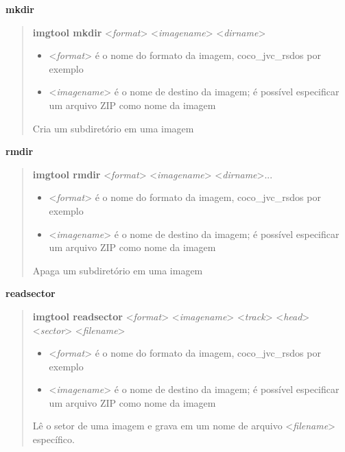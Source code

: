 \documentclass[letterpaper,10pt,brazil]{sphinxmanual}
\begin{document}
\textbf{mkdir}
\begin{quote}

\textbf{imgtool mkdir} \textless{}\emph{format}\textgreater{} \textless{}\emph{imagename}\textgreater{} \textless{}\emph{dirname}\textgreater{}
\begin{itemize}
\item {} 
\textless{}\emph{format}\textgreater{} é o nome do formato da imagem, coco\_jvc\_rsdos por exemplo

\item {} 
\textless{}\emph{imagename}\textgreater{} é o nome de destino da imagem; é possível especificar um arquivo ZIP como nome da imagem

\end{itemize}

Cria um subdiretório em uma imagem
\end{quote}

\textbf{rmdir}
\begin{quote}

\textbf{imgtool rmdir} \textless{}\emph{format}\textgreater{} \textless{}\emph{imagename}\textgreater{} \textless{}\emph{dirname}\textgreater{}...
\begin{itemize}
\item {} 
\textless{}\emph{format}\textgreater{} é o nome do formato da imagem, coco\_jvc\_rsdos por exemplo

\item {} 
\textless{}\emph{imagename}\textgreater{} é o nome de destino da imagem; é possível especificar um arquivo ZIP como nome da imagem

\end{itemize}

Apaga um subdiretório em uma imagem
\end{quote}

\textbf{readsector}
\begin{quote}

\textbf{imgtool readsector} \textless{}\emph{format}\textgreater{} \textless{}\emph{imagename}\textgreater{} \textless{}\emph{track}\textgreater{} \textless{}\emph{head}\textgreater{} \textless{}\emph{sector}\textgreater{} \textless{}\emph{filename}\textgreater{}
\begin{itemize}
\item {} 
\textless{}\emph{format}\textgreater{} é o nome do formato da imagem, coco\_jvc\_rsdos por exemplo

\item {} 
\textless{}\emph{imagename}\textgreater{} é o nome de destino da imagem; é possível especificar um arquivo ZIP como nome da imagem

\end{itemize}

Lê o setor de uma imagem e grava em um nome de arquivo \textless{}\emph{filename}\textgreater{} específico.
\end{quote}
\end{document}
